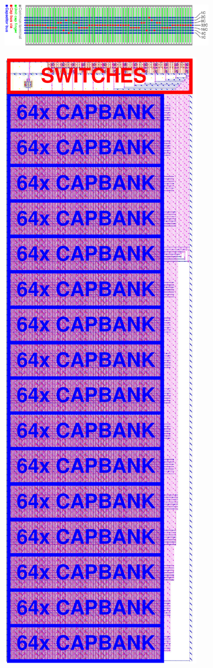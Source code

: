 	\begin{figure}[htb!]
	    \centering
	    \begin{subfigure}{0.5\textwidth}
	        \centering
	        \includegraphics[height=0.18\textheight, angle=90]{figs/design/capbank}
	        \caption{ }
	        \label{fig:lay_capbank_}
	    \end{subfigure}%
	    \begin{subfigure}{0.5\textwidth}
	        \centering
	        \includegraphics[height=0.8\textheight, angle=0]{figs/design/cdac_lay}

\end{subfigure}
\end{figure}
